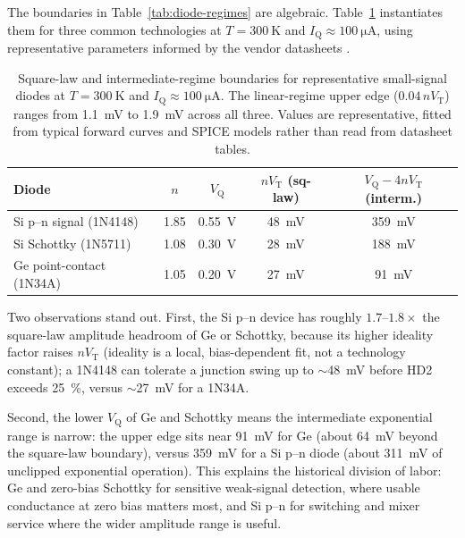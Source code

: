 \documentclass[12pt]{article}
\newcommand{\VT}{V_{\mathrm{T}}}
\newcommand{\VQ}{V_{\mathrm{Q}}}
\newcommand{\IQ}{I_{\mathrm{Q}}}
\begin{document}
The boundaries in Table~\ref{tab:diode-regimes} are algebraic. Table~\ref{tab:diode-numbers} instantiates them for three common technologies at $T = \SI{300}{\kelvin}$ and $\IQ \approx \SI{100}{\micro\ampere}$, using representative parameters informed by the vendor datasheets \cite{nxp1n4148,skyworks1n5711,1n34a}.

\begin{table}[H]
\centering
\renewcommand{\arraystretch}{1.3}
\setlength{\tabcolsep}{5pt}
\caption{Square-law and intermediate-regime boundaries for representative small-signal diodes at $T = \SI{300}{\kelvin}$ and $\IQ \approx \SI{100}{\micro\ampere}$. The linear-regime upper edge ($0.04\,n\VT$) ranges from \SI{1.1}{\milli\volt} to \SI{1.9}{\milli\volt} across all three. Values are representative, fitted from typical forward curves and SPICE models rather than read from datasheet tables.}
\label{tab:diode-numbers}

\vspace{0.5\baselineskip}

\begin{tabular}{l c c c c}
\toprule
\textbf{Diode} & $n$ & $\VQ$ & $n\VT$ (sq-law) & $\VQ - 4n\VT$ (interm.) \\
\midrule
Si p--n signal (1N4148)        & 1.85 & \SI{0.55}{\volt} & \SI{48}{\milli\volt} & \SI{359}{\milli\volt} \\
Si Schottky (1N5711)           & 1.08 & \SI{0.30}{\volt} & \SI{28}{\milli\volt} & \SI{188}{\milli\volt} \\
Ge point-contact (1N34A)       & 1.05 & \SI{0.20}{\volt} & \SI{27}{\milli\volt} & \SI{91}{\milli\volt}  \\
\bottomrule
\end{tabular}
\end{table}

Two observations stand out. First, the Si p--n device has roughly $1.7$--$1.8\times$ the square-law amplitude headroom of Ge or Schottky, because its higher ideality factor raises $n\VT$ (ideality is a local, bias-dependent fit, not a technology constant); a 1N4148 can tolerate a junction swing up to $\sim$\SI{48}{\milli\volt} before HD2 exceeds \SI{25}{\percent}, versus $\sim$\SI{27}{\milli\volt} for a 1N34A.

Second, the lower $\VQ$ of Ge and Schottky means the intermediate exponential range is narrow: the upper edge sits near \SI{91}{\milli\volt} for Ge (about \SI{64}{\milli\volt} beyond the square-law boundary), versus \SI{359}{\milli\volt} for a Si p--n diode (about \SI{311}{\milli\volt} of unclipped exponential operation). This explains the historical division of labor: Ge and zero-bias Schottky for sensitive weak-signal detection, where usable conductance at zero bias matters most, and Si p--n for switching and mixer service where the wider amplitude range is useful.
\end{document}
